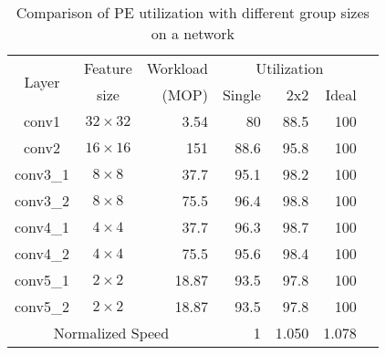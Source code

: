 \begin{table}[tb]
    \centering
    \caption{Comparison of PE utilization with different group sizes on a network}
      \begin{tabular}{|c|c|r|r|r|r|r|}
      \hline
      \multirow{2}[4]{*}{Layer} & Feature & Workload & \multicolumn{3}{c|}{Utilization} \\
  \cline{4-6}          & size & (MOP) & Single & 2x2 & Ideal\\
      \hline
      conv1 & $32\times 32$ & 3.54 & 80    & 88.5  & 100\\
      \hline
      conv2 & $16\times 16$ & 151 & 88.6  & 95.8  & 100\\
      \hline
      conv3\_1 & $8\times 8$   & 37.7 & 95.1  & 98.2  & 100\\
      \hline
      conv3\_2 & $8\times 8$   & 75.5 & 96.4  & 98.8  & 100\\
      \hline
      conv4\_1 & $4\times 4$   & 37.7 & 96.3  & 98.7  & 100\\
      \hline
      conv4\_2 & $4\times 4$   & 75.5 & 95.6  & 98.4  & 100\\
      \hline
      conv5\_1 & $2\times 2$   & 18.87 & 93.5  & 97.8  & 100\\
      \hline
      conv5\_2 & $2\times 2$   & 18.87 & 93.5  & 97.8  & 100\\
      \hline
      \multicolumn{3}{|c|}{Normalized Speed} & 1     & 1.050 & 1.078 \\
      \hline
      \end{tabular}
    \label{tab:hw_util}
  \end{table}